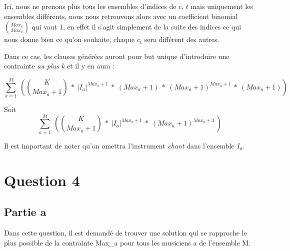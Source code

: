 \documentclass[11pt]{article}
\begin{document}
Ici, nous ne prenons plus tous les ensembles d'indices de $c$, $t$ mais uniquement les ensembles différents, nous nous retrouvons alors avec un coefficient binomial ${Max_a \choose Max_a}$ qui vaut 1, en effet il s'agit simplement de la suite des indices ce qui nous donne bien ce qu'on souhaite, chaque $c_t$ sera différent des autres.

\label{addendum}

Dans ce cas, les clauses générées auront pour but unique d'introduire une contrainte \textsl{au plus k} et il y en aura :

$$\sum_{a=1}^{M}\ \left( {K \choose Max_a+1}\ * \ |I_a|^{Max_a+1}\ *\ \left(Max_a+1\right)\ *\ \left(Max_a+1\right)^{Max_a+1}\ *\  \left(Max_a+1\right) \right) $$

Soit\\

$$\sum_{a=1}^{M}\ \left( {K \choose Max_a+1}\ * \ |I_a|^{Max_a+1}\ *\ \left(Max_a+1\right)^{Max_a+3}\ \right) $$

Il est important de noter qu'on omettra l'instrument \textsl{chant} dans l'ensemble $I_a$.

\section{Question 4}

\subsection {Partie a}

Dans cette question, il est demandé de trouver une solution qui se rapproche le plus possible de la contrainte Max_a pour tous les musiciens a de l'ensemble M.
\end{document}
